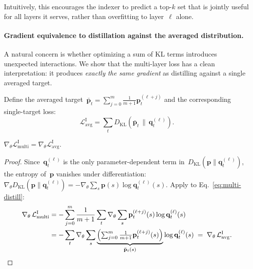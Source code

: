 Intuitively, this encourages the indexer to predict a top-$k$ set that is jointly useful for all layers it serves, rather than overfitting to layer~$\ell$ alone.

\paragraph{Gradient equivalence to distillation against the averaged distribution.}
A natural concern is whether optimizing a sum of KL terms introduces unexpected interactions.
We show that the multi-layer loss has a clean interpretation: it produces \emph{exactly the same gradient} as distilling against a single averaged target.

Define the averaged target~$\bar{\mathbf{p}}_{t} = \sum_{j=0}^{m} \frac{1}{m+1}\mathbf{p}^{(\ell+j)}_{t}$ and the corresponding single-target loss:
{\footnotesize
\begin{equation}
    \mathcal{L}^{\mathrm{I}}_{\mathrm{avg}}
    = \sum_{t} D_{\mathrm{KL}}\!\left(
        \bar{\mathbf{p}}_{t} \,\big\|\, \mathbf{q}^{(\ell)}_t
      \right).
    \label{eq:avg-distill}
\end{equation}
}

\begin{proposition}
\label{prop:grad-equiv}
$\nabla_\theta \mathcal{L}^{\mathrm{I}}_{\mathrm{multi}} = \nabla_\theta \mathcal{L}^{\mathrm{I}}_{\mathrm{avg}}$.
\end{proposition}

\begin{proof}
Since~$\mathbf{q}^{(\ell)}_t$ is the only parameter-dependent term in~$D_{\mathrm{KL}}(\mathbf{p} \| \mathbf{q}^{(\ell)}_t)$, the entropy of~$\mathbf{p}$ vanishes under differentiation:
$\nabla_\theta D_{\mathrm{KL}}(\mathbf{p} \| \mathbf{q}^{(\ell)}_t) = -\nabla_\theta \sum_{s} \mathbf{p}(s) \log \mathbf{q}^{(\ell)}_t(s)$.
Apply to Eq.~\ref{eq:multi-distill}:
{\footnotesize
\begin{align}
    \nabla_\theta \, \mathcal{L}^{\mathrm{I}}_{\mathrm{multi}}
    &= -\sum_{j=0}^{m} \frac{1}{m+1} \sum_{t} \nabla_\theta \sum_{s} \mathbf{p}^{(\ell+j)}_{t}(s) \log \mathbf{q}^{(\ell)}_t(s) \notag \\
    &= -\sum_{t} \nabla_\theta \sum_{s} \underbrace{\Bigl(\textstyle\sum_{j=0}^{m} \frac{1}{m+1} \mathbf{p}^{(\ell+j)}_{t}(s)\Bigr)}_{\bar{\mathbf{p}}_{t}(s)} \log \mathbf{q}^{(\ell)}_t(s)
    \;=\; \nabla_\theta \, \mathcal{L}^{\mathrm{I}}_{\mathrm{avg}}.
    \label{eq:grad-equiv-proof}
\end{align}
}
\end{proof}

